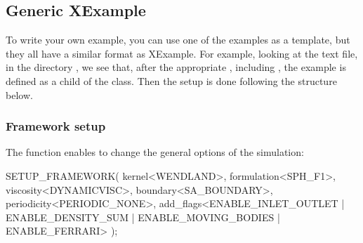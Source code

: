 \subsection{Generic XExample}

To write your own example, you can use one of the examples as a template, 
but they all have a similar format as XExample.  
For example, looking at the text file,  in the directory 
, we see that, after the appropriate , 
including , the example is defined as a 
child of the  class.  
Then the setup is done following the structure below.


\subsubsection{Framework setup}

The  function enables to change the
 general options of the simulation:
\begin{ccode}
  SETUP_FRAMEWORK(
    kernel<WENDLAND>,
    formulation<SPH_F1>,
    viscosity<DYNAMICVISC>,
    boundary<SA_BOUNDARY>,
    periodicity<PERIODIC_NONE>,
    add_flags<ENABLE_INLET_OUTLET | ENABLE_DENSITY_SUM 
        | ENABLE_MOVING_BODIES | ENABLE_FERRARI>
  );
\end{ccode}

